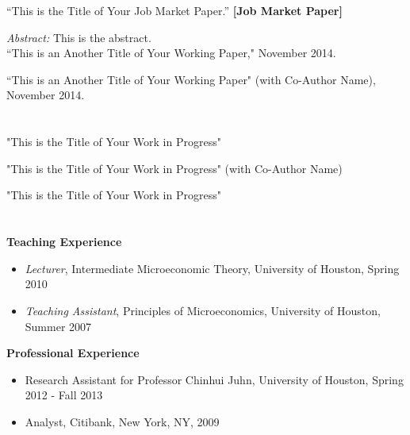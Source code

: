 \documentclass[margin, 11pt]{res} %
\begin{document}
\begin{resume}
``This is the Title of Your Job Market Paper.'' \textbf{[Job Market Paper]} 

\emph{Abstract:} This is the abstract.\\

``This is an Another Title of Your Working Paper,"  November 2014. 

``This is an Another Title of Your Working Paper" (with Co-Author Name), November 2014.\\


\section{ }

"This is the Title of Your Work in Progress"

"This is the Title of Your Work in Progress" (with Co-Author Name)

"This is the Title of Your Work in Progress"\\




\newpage %

\section{}

\textbf{Teaching Experience}
\begin{itemize}
	\item \emph{Lecturer}, Intermediate Microeconomic Theory, University of Houston, Spring 2010
	\item \emph{Teaching Assistant}, Principles of Microeconomics, University of Houston, Summer 2007\\
\end{itemize}
  

\textbf{Professional Experience}

\begin{itemize}
	\item Research Assistant for Professor Chinhui Juhn, University of Houston, Spring 2012 - Fall 2013
	\item Analyst, Citibank, New York, NY, 2009
\end{itemize}	



\end{resume}
\end{document}

